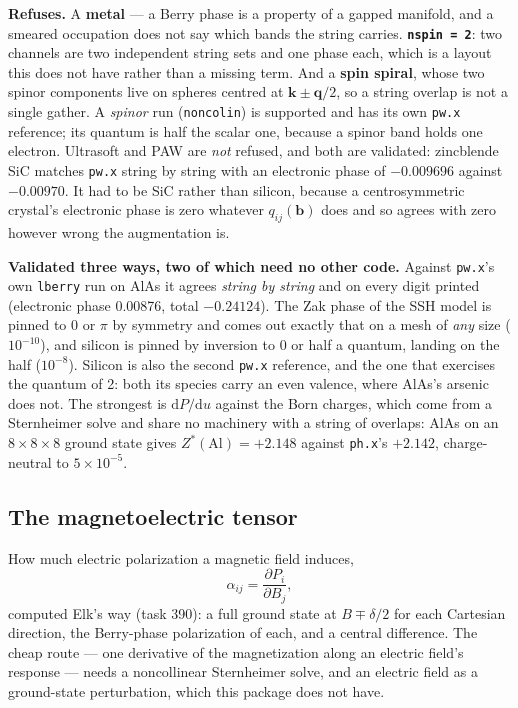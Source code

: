 \documentclass[11pt,a4paper]{article}
\newcommand{\code}[1]{\texttt{\small #1}}
\begin{document}
\begin{refuses}
\textbf{Refuses.} A \textbf{metal} --- a Berry phase is a property of a gapped
manifold, and a smeared occupation does not say which bands the string carries.
\textbf{\code{nspin = 2}}: two channels are two independent string sets and one
phase each, which is a layout this does not have rather than a missing term.
And a \textbf{spin spiral}, whose two spinor components live on spheres centred
at $\mathbf k \pm \mathbf q/2$, so a string overlap is not a single gather. A
\emph{spinor} run (\code{noncolin}) is supported and has its own \code{pw.x}
reference; its quantum is half the scalar one, because a spinor band holds one
electron.
Ultrasoft and PAW are \emph{not} refused, and both are validated: zincblende
SiC matches \code{pw.x} string by string with an electronic phase of $-0.009696$
against $-0.00970$. It had to be SiC rather than silicon, because a
centrosymmetric crystal's electronic phase is zero whatever $q_{ij}(\mathbf b)$
does and so agrees with zero however wrong the augmentation is.
\end{refuses}

\textbf{Validated three ways, two of which need no other code.} Against
\code{pw.x}'s own \code{lberry} run on AlAs it agrees \emph{string by string} and
on every digit printed (electronic phase 0.00876, total $-0.24124$). The Zak
phase of the SSH model is pinned to $0$ or $\pi$ by symmetry and comes out
exactly that on a mesh of \emph{any} size ($10^{-10}$), and silicon is pinned by
inversion to $0$ or half a quantum, landing on the half ($10^{-8}$). Silicon is
also the second \code{pw.x} reference, and the one that exercises the quantum of
2: both its species carry an even valence, where AlAs's arsenic does not. The strongest is
$\mathrm dP/\mathrm du$ against the Born charges, which come from a Sternheimer
solve and share no machinery with a string of overlaps: AlAs on an
$8\times8\times8$ ground state gives $Z^*(\mathrm{Al}) = +2.148$ against
\code{ph.x}'s $+2.142$, charge-neutral to $5\times10^{-5}$.

\subsection{The magnetoelectric tensor}

How much electric polarization a magnetic field induces,
\begin{equation*}
  \alpha_{ij} = \frac{\partial P_i}{\partial B_j},
\end{equation*}
computed Elk's way (task 390): a full ground state at $B \mp \delta/2$ for each
Cartesian direction, the Berry-phase polarization of each, and a central
difference. The cheap route --- one derivative of the magnetization along an
electric field's response --- needs a noncollinear Sternheimer solve, and an
electric field as a ground-state perturbation, which this package does not have.
\end{document}
